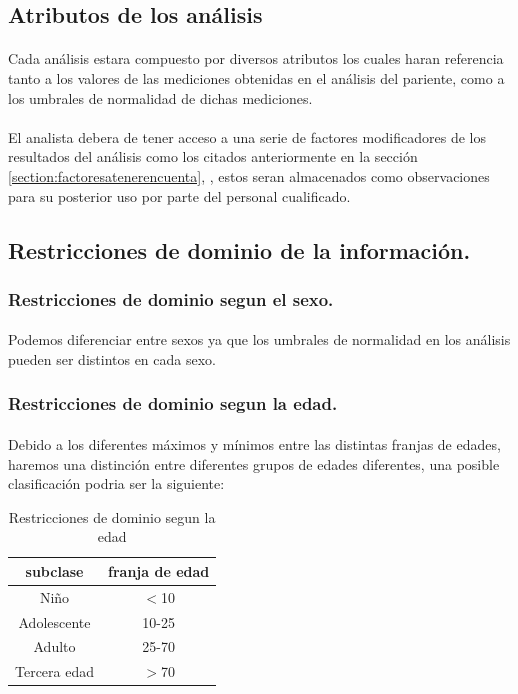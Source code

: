 \documentclass[a4paper,10pt]{article}
\begin{document}
\subsection{Atributos de los análisis}
\paragraph{}
Cada análisis estara compuesto por diversos atributos los cuales haran referencia tanto a los valores de las mediciones obtenidas en el análisis del pariente, como a los umbrales de normalidad de dichas mediciones.
\paragraph{}
El analista debera de tener acceso a una serie de factores modificadores de los resultados del análisis como los citados anteriormente en la sección \ref{section:factoresatenerencuenta}, , estos seran almacenados como observaciones para su posterior uso por parte del personal cualificado.

\pagebreak
\subsection{Restricciones de dominio de la información.}
\subsubsection{Restricciones de dominio segun el sexo.}
\paragraph{}
Podemos diferenciar entre sexos ya que los umbrales de normalidad en los análisis pueden ser distintos en cada sexo.

\subsubsection{Restricciones de dominio segun la edad.}
\paragraph{}
Debido a los diferentes máximos y mínimos entre las distintas franjas de edades, haremos una distinción entre diferentes grupos de edades diferentes, una posible clasificación podria ser la siguiente:
\begin{table}[hbt]
		\begin{center}
		\begin{tabular}{|c|c|}\hline
			subclase & franja de edad \\ \hline
			Niño & $<$10 \\ \hline
			Adolescente & 10-25 \\ \hline
			Adulto & 25-70 \\ \hline
			Tercera edad & $>$70 \\ \hline
		\end{tabular}
		\caption{Restricciones de dominio segun la edad}
	\end{center}
\end{table}
\end{document}

